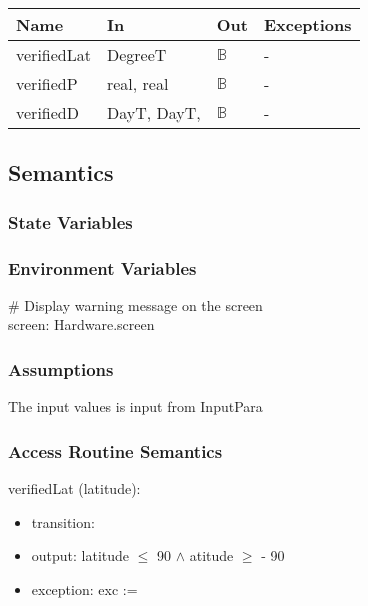 \documentclass[12pt, titlepage]{article}
\begin{document}
\begin{center}
\begin{tabular}{p{2cm} p{5cm} p{2cm} p{5cm}}
\hline
\textbf{Name} & \textbf{In} & \textbf{Out} & \textbf{Exceptions} \\
\hline 
verifiedLat & DegreeT& $\mathbb{B}$ & - \\
verifiedP &  real, real & $\mathbb{B}$ & - \\
verifiedD & DayT, DayT, & $\mathbb{B}$ & - \\
\hline
\end{tabular}
\end{center}


\subsection{Semantics}

\subsubsection{State Variables}



\subsubsection{Environment Variables}
\# Display warning message on the screen\\
screen: Hardware.screen\\

\subsubsection{Assumptions}
The input values is input from InputPara


\subsubsection{ Access Routine Semantics}

\noindent  verifiedLat (latitude):
\begin{itemize}
\item transition: 
\item output: latitude $\leq$ 90 $\land$ atitude $\geq$ - 90 

\item exception: exc := 
\end{itemize}
\end{document}
